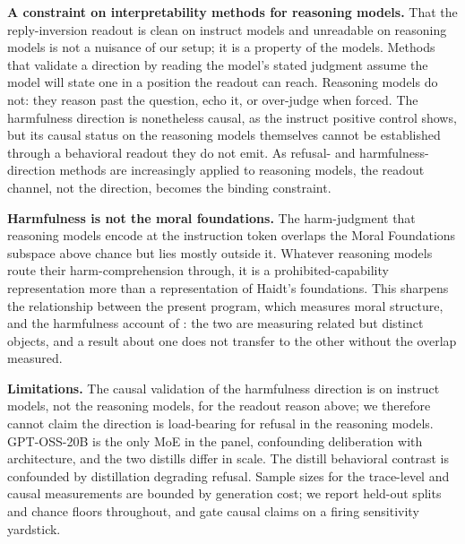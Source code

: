 \textbf{A constraint on interpretability methods for reasoning models.} That the
reply-inversion readout is clean on instruct models and unreadable on reasoning
models is not a nuisance of our setup; it is a property of the models. Methods that
validate a direction by reading the model's stated judgment assume the model will
state one in a position the readout can reach. Reasoning models do not: they reason
past the question, echo it, or over-judge when forced. The harmfulness direction is
nonetheless causal, as the instruct positive control shows, but its causal status on
the reasoning models themselves cannot be established through a behavioral readout
they do not emit. As refusal- and harmfulness-direction methods are increasingly
applied to reasoning models, the readout channel, not the direction, becomes the
binding constraint.

\textbf{Harmfulness is not the moral foundations.} The harm-judgment that reasoning
models encode at the instruction token overlaps the Moral Foundations subspace above
chance but lies mostly outside it. Whatever reasoning models route their
harm-comprehension through, it is a prohibited-capability representation more than a
representation of Haidt's foundations. This sharpens the relationship between the
present program, which measures moral structure, and the harmfulness account of
\citet{zhao2025harmfulness}: the two are measuring related but distinct objects, and
a result about one does not transfer to the other without the overlap measured.

\textbf{Limitations.} The causal validation of the harmfulness direction is on instruct
models, not the reasoning models, for the readout reason above; we therefore cannot
claim the direction is load-bearing for refusal in the reasoning models. GPT-OSS-20B
is the only MoE in the panel, confounding deliberation with architecture, and the
two distills differ in scale. The distill behavioral contrast is confounded by
distillation degrading refusal. Sample sizes for the trace-level and causal
measurements are bounded by generation cost; we report held-out splits and
chance floors throughout, and gate causal claims on a firing sensitivity yardstick.
